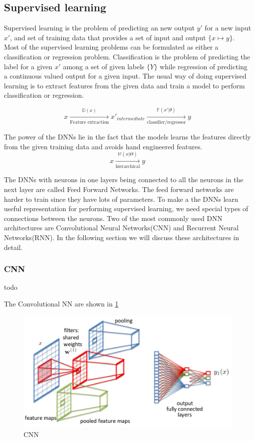 \documentclass[conference]{IEEEtran}
\newcommand*{\everymodeprime}{\ensuremath{\prime}}
\begin{document}
\subsection{Supervised learning}
Supervised learning is the problem of predicting an new output $y\everymodeprime$  for a new input $x\everymodeprime$, and set of training data that provides a set of input and output $\{x \mapsto y\}$. Most of the supervised learning problems can be formulated as either a classification or regression problem. Classification is the problem of predicting the label for a given  $x\everymodeprime$ among a set of given labels $\{Y\}$ while regression of predicting a continuous  valued output for a given input. The usual way of doing supervised learning is to extract features from the given data and train a model to perform classification or regression. 


$$x \xrightarrow[\text{Feature extraction}]{ \mathbb{D}(x) } x\everymodeprime _{intermediate} \xrightarrow[\text{classifier/regressor}]{\mathbb{F}(x\everymodeprime | \theta)}   y$$

The power of the DNNs lie in the fact that the models learns the features directly from the given training data and avoids hand engineered features. 
$$ x \xrightarrow[ \text{hierarchical}] { \mathbb{M}(x | \Theta) } y$$


The DNNs with neurons in one layers being connected to all the neurons in the next layer are called Feed Forward Networks. The feed forward networks are harder to train since they have lots of parameters. To make a the DNNs learn useful representation for performing supervised learning, we need special types of connections between the neurons. Two of the most commonly used DNN architectures are Convolutional Neural Networks(CNN) and Recurrent Neural Networks(RNN). In the following section we will discuss these architectures in detail.


\subsubsection{CNN}
todo

The Convolutional NN are shown in \ref{fig:cnn}

\begin{figure}
    \includegraphics[width=.99\linewidth]{img/cnn.png}  
    \caption{CNN}
    \label{fig:cnn}
\end{figure}
\end{document}
